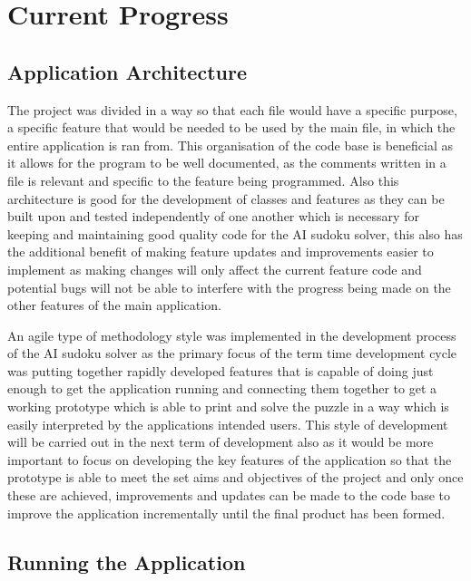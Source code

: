 \documentclass[]{final_report}
\begin{document}
\chapter{Current Progress}

\section{Application Architecture}

The project was divided in a way so that each file would have a specific purpose, a specific feature that would be needed to be used by the main file, in which the entire application is ran from. This organisation of the code base is beneficial as it allows for the program to be well documented, as the comments written in a file is relevant and specific to the feature being programmed. Also this architecture is good for the development of classes and features as they can be built upon and tested independently of one another which is necessary for keeping and maintaining good quality code for the AI sudoku solver, this also has the additional benefit of making feature updates and improvements easier to implement as making changes will only affect the current feature code and potential bugs will not be able to interfere with the progress being made on the other features of the main application. 

An agile type of methodology style was implemented in the development process of the AI sudoku solver as the primary focus of the term time development cycle was putting together rapidly developed features that is capable of doing just enough to get the application running and connecting them together to get a working prototype which is able to print and solve the puzzle in a way which is easily interpreted by the applications intended users. This style of development will be carried out in the next term of development also as it would be more important to focus on developing the key features of the application so that the prototype is able to meet the set aims and objectives of the project and only once these are achieved, improvements and updates can be made to the code base to improve the application incrementally until the final product has been formed. 

\section{Running the Application}
\end{document}
